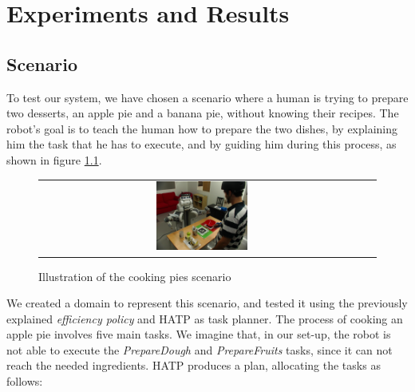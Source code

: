 \chapter{Experiments and Results} %



\label{chapter:teacher_results} %


 \section{Scenario}
\label{sec:teacher_results-scenario}
To test our system, we have chosen a scenario where a human is trying to prepare two desserts, an apple pie and a banana pie, without knowing their recipes. The robot's goal is to teach the human how to prepare the two dishes, by explaining him the task that he has to execute, and by guiding him during this process, as shown in figure \ref{fig:teacher_results-scenario}. 

\begin{figure}[ht!]

 \centering
 \begin{tabular}{cc}
  \includegraphics[width=0.29\textwidth]{img/teacher/scenario.JPG}
 \end{tabular}
 \caption{Illustration of the cooking pies scenario}
 \label{fig:teacher_results-scenario}
 \end{figure}

We created a domain to represent this scenario, and tested it using the previously explained \textit{efficiency policy} and HATP as task planner. The process of cooking an apple pie involves five main tasks. We imagine that, in our set-up, the robot is not able to execute the \textit{PrepareDough} and \textit{PrepareFruits} tasks, since it can not reach the needed ingredients. HATP produces a plan, allocating the tasks as follows:

